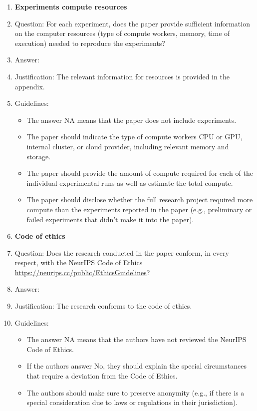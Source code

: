 \documentclass{article}
\theoremstyle{plain}
\theoremstyle{definition}
\theoremstyle{remark}
\begin{document}
\begin{enumerate}
\item {\bf Experiments compute resources}
    \item[] Question: For each experiment, does the paper provide sufficient information on the computer resources (type of compute workers, memory, time of execution) needed to reproduce the experiments?
    \item[] Answer: \answerYes{} %
    \item[] Justification: The relevant information for resources is provided in the appendix.
    \item[] Guidelines:
    \begin{itemize}
        \item The answer NA means that the paper does not include experiments.
        \item The paper should indicate the type of compute workers CPU or GPU, internal cluster, or cloud provider, including relevant memory and storage.
        \item The paper should provide the amount of compute required for each of the individual experimental runs as well as estimate the total compute. 
        \item The paper should disclose whether the full research project required more compute than the experiments reported in the paper (e.g., preliminary or failed experiments that didn't make it into the paper). 
    \end{itemize}
    
\item {\bf Code of ethics}
    \item[] Question: Does the research conducted in the paper conform, in every respect, with the NeurIPS Code of Ethics \url{https://neurips.cc/public/EthicsGuidelines}?
    \item[] Answer: \answerYes{} %
    \item[] Justification: The research conforms to the code of ethics.
    \item[] Guidelines:
    \begin{itemize}
        \item The answer NA means that the authors have not reviewed the NeurIPS Code of Ethics.
        \item If the authors answer No, they should explain the special circumstances that require a deviation from the Code of Ethics.
        \item The authors should make sure to preserve anonymity (e.g., if there is a special consideration due to laws or regulations in their jurisdiction).
    \end{itemize}



\end{enumerate}
\end{document}
